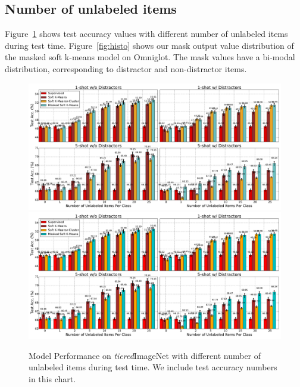 \subsection{Number of unlabeled items}
Figure~\ref{fig:tnet_num_unlabel_text} shows test accuracy values with different number of unlabeled items during test time. Figure~\ref{fig:histo} shows our mask output value distribution of the masked soft k-means model on Omniglot. The mask values have a bi-modal distribution, corresponding to distractor and non-distractor items.
\begin{figure}
    \centering
    \iflatexml
    \includegraphics[width=6\textwidth]{figures/tnet_num_unlabel_text.png}
    \else
    \includegraphics[width=\textwidth]{figures/tnet_num_unlabel_text.pdf}
    \fi
    \caption{Model Performance on \textit{tiered}ImageNet with different number of unlabeled items during test time. We include test accuracy numbers in this chart.}
    \label{fig:tnet_num_unlabel_text}
\end{figure}

